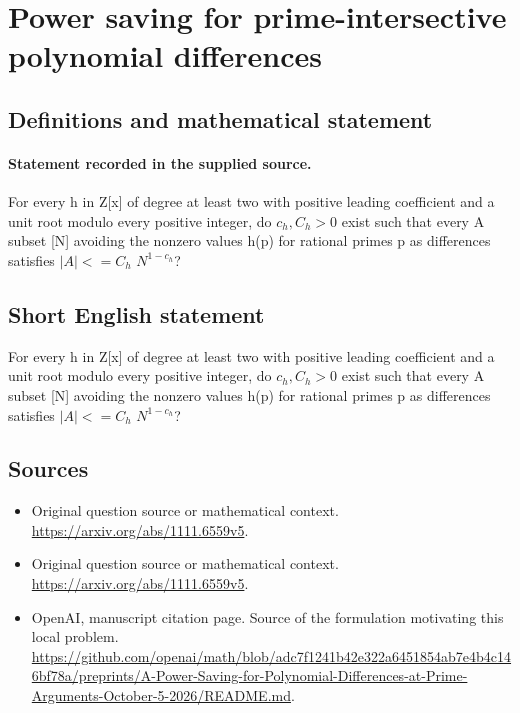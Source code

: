 \documentclass[11pt]{article}
\begin{document}
\section*{Power saving for prime-intersective polynomial differences}\label{statement}
\subsection{Definitions and mathematical statement}
\paragraph{Statement recorded in the supplied source.}
For every h in Z[x] of degree at least two with positive leading coefficient and a unit root modulo every positive integer, do $c_h,C_h>0$ exist such that every A subset [N] avoiding the nonzero values h(p) for rational primes p as differences satisfies $|A|<=C_h$ $N^{1-c_h}$?
\subsection{Short English statement}
For every h in Z[x] of degree at least two with positive leading coefficient and a unit root modulo every positive integer, do $c_h,C_h>0$ exist such that every A subset [N] avoiding the nonzero values h(p) for rational primes p as differences satisfies $|A|<=C_h$ $N^{1-c_h}$?
\subsection{Sources}
\begin{itemize}
\item[S1] Original question source or mathematical context.
\url{https://arxiv.org/abs/1111.6559v5}.
\item[S2] Original question source or mathematical context.
\url{https://arxiv.org/abs/1111.6559v5}.
\item[S3] OpenAI, manuscript citation page. Source of the formulation motivating this local problem.
\url{https://github.com/openai/math/blob/adc7f1241b42e322a6451854ab7e4b4c146bf78a/preprints/A-Power-Saving-for-Polynomial-Differences-at-Prime-Arguments-October-5-2026/README.md}.
\end{itemize}
\end{document}
